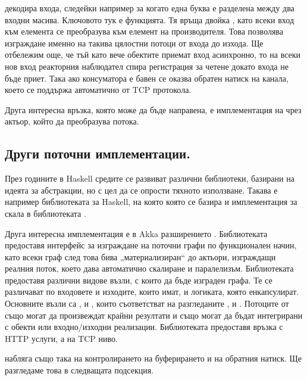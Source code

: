  декодира входа, следейки например за когато една буква е разделена между два входни масива. Ключовото тук е  функцията. Тя връща двойка , като всеки вход към  елемента се преобразува към елемент на  производителя. Това позволява изграждане именно на такива цялостни потоци от входа до изхода. Ще отбележим още, че тъй като вече  обектите приемат вход асинхронно, то на всеки нов вход реакторния наблюдател спира регистрация за четене докато входа не бъде приет. Така ако консуматора е бавен се оказва обратен натиск на канала, което се поддържа автоматично от TCP протокола.

Друга интересна връзка, която може да бъде направена, е имплементация на  чрез актьор, който да преобразува потока.

\subsection{Други поточни имплементации. }

През годините в Haskell средите се развиват различни библиотеки, базирани на идеята за  абстракции, но с цел да се опрости тяхното използване. Такава е например библиотеката  за Haskell, на която която се базира и имплементация за скала в библиотеката .

Друга интересна имплементация е в Akka разширението  \cite{akkaStreams2015}. Библиотеката предоставя интерфейс за изграждане на поточни графи по функционален начин, като всеки граф след това бива „материализиран“ до актьори, изграждащи реалния поток, което дава автоматично скалиране и паралелизъм. Библиотеката предоставя различни видове възли, с които да бъде изграден графа. Те се различават по входовете и изходите, които имат, и логиката, която енкапсулират. Основните възли са ,  и , които съответстват на разгледаните ,  и . Потоците от  също могат да произвеждат крайни резултати и също могат да бъдат интегрирани с  обекти или входно/изходни реализации. Библиотеката  предоставя връзка с HTTP услуги, а  на TCP ниво.

 набляга също така на контролирането на буферирането и на обратния натиск. Ще разгледаме това в следващата подсекция.

